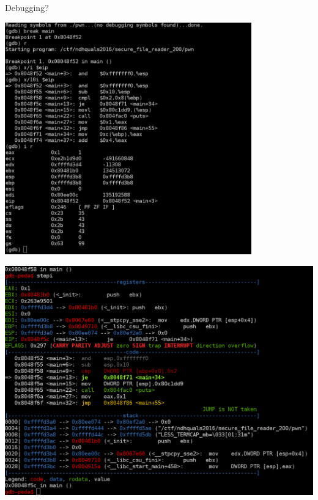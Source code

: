 \begin{frame}[plain]
	\begin{center}
    \huge Debugging?
	\end{center}
\end{frame}


{
\begin{frame}[plain]
  \begin{center}
    \includegraphics[width=0.8\textwidth]{./images/gdb-plain.png}
  \end{center}
\end{frame}

\begin{frame}[plain]
  \begin{center}
    \includegraphics[width=\textwidth]{./images/gdb-peda.png}
  \end{center}
\end{frame}
}

